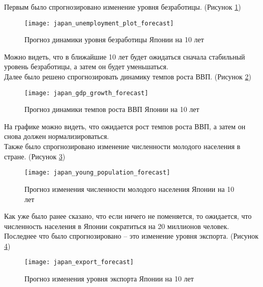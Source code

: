 \newpage

Первым было спрогнозировано изменение уровня безработицы. (Рисунок \ref{fig:japan_unemployment_plot_forecast})

\begin{figure}[h]
	\centering \texttt{[image: japan\_unemployment\_plot\_forecast]}
	\caption{Прогноз динамики уровня безработицы Японии на 10 лет}
	\label{fig:japan_unemployment_plot_forecast}
\end{figure}

Можно видеть, что в ближайшие 10 лет будет ожидаться сначала стабильный уровень безработицы, а затем он будет уменьшаться.\\

Далее было решено спрогнозировать динамику темпов роста ВВП. (Рисунок \ref{fig:japan_gdp_growth_forecast})

\begin{figure}[h]
	\centering \texttt{[image: japan\_gdp\_growth\_forecast]}
	\caption{Прогноз динамики темпов роста ВВП Японии на 10 лет}
	\label{fig:japan_gdp_growth_forecast}
\end{figure}

\newpage

На графике можно видеть, что ожидается рост темпов роста ВВП, а затем он снова должен нормализироваться.\\

Также было спрогнозировано изменение численности молодого населения в стране. (Рисунок \ref{fig:japan_young_population_forecast})

\begin{figure}[h]
	\centering \texttt{[image: japan\_young\_population\_forecast]}
	\caption{Прогноз изменения численности молодого населения Японии на 10 лет}
	\label{fig:japan_young_population_forecast}
\end{figure}

Как уже было ранее сказано, что если ничего не поменяется, то ожидается, что численность населения в Японии сократиться на 20 миллионов человек.\\

Последнее что было спрогнозировано -- это изменение уровня экспорта.  (Рисунок \ref{fig:japan_export_forecast})

\begin{figure}[h]
	\centering \texttt{[image: japan\_export\_forecast]}
	\caption{Прогноз изменения уровня экспорта Японии на 10 лет}
	\label{fig:japan_export_forecast}
\end{figure}

